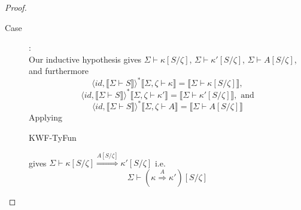 \documentclass{article}
\newcommand{\sem}[1]{\llbracket #1 \rrbracket}
\begin{document}
\begin{proof}
\begin{description}
\item[Case ]:~\\
Our inductive hypothesis gives $\Sigma \vdash \kappa[S/\zeta]$, $\Sigma \vdash \kappa'[S/\zeta]$,
$\Sigma \vdash A[S/\zeta]$, and furthermore $$\langle \mathit{id}, \sem{\Sigma \vdash S} \rangle^*\sem{\Sigma,\zeta \vdash \kappa} = \sem{\Sigma \vdash \kappa[S/\zeta]},$$ $$\langle \mathit{id}, \sem{\Sigma \vdash S} \rangle^* \sem{\Sigma,\zeta \vdash \kappa'} = \sem{\Sigma \vdash \kappa'[S/\zeta]}, \text{ and}$$ $$\langle \mathit{id}, \sem{\Sigma \vdash S} \rangle^* \sem{\Sigma,\zeta \vdash A} = \sem{\Sigma \vdash A[S/\zeta]}$$  Applying \begin{sc}KWF-TyFun\end{sc} gives $\Sigma \vdash \kappa[S/\zeta] \overset{A[S/\zeta]}{\Rightarrow} \kappa'[S/\zeta]$ i.e. $$\Sigma \vdash (\kappa \overset{A}{\Rightarrow} \kappa')[S/\zeta]$$


\end{description}
\end{proof}
\end{document}
